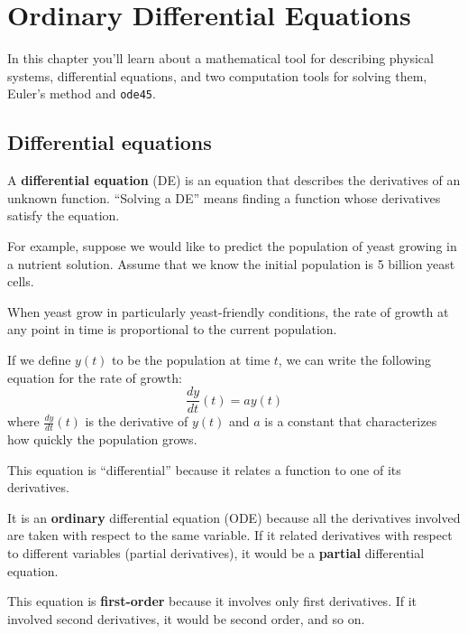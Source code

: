 \documentclass[main.tex]{subfiles}
\begin{document}
\chapter{Ordinary Differential Equations}

In this chapter you'll learn about a mathematical tool for describing physical systems, differential equations, and two computation tools for solving them, Euler's method and {\tt ode45}.


\section{Differential equations}
\label{diffeq}

A {\bf differential equation} (DE) is an equation that describes the
derivatives of an unknown function.  ``Solving a DE'' means finding a
function whose derivatives satisfy the equation.


For example, suppose we would like to predict the population of yeast growing in a nutrient solution.  Assume that we know the initial population is 5 billion yeast cells.

When yeast grow in particularly yeast-friendly
conditions, the rate of growth at any point in time is proportional to
the current population.

If we define $y(t)$ to be the population at 
time $t$, we can write the following equation for the rate of growth:
%
\begin{equation}
\frac{dy}{dt}(t) = a y(t)
\end{equation}
%
where $\frac{dy}{dt}(t)$ is the derivative of $y(t)$ and
$a$ is a constant that characterizes how quickly the population
grows.

This equation is ``differential'' because it relates a function to one of its derivatives.


It is an {\bf ordinary} differential equation (ODE) because all the
derivatives involved are taken with respect to the
same variable.
If it related derivatives with respect to
different variables (partial derivatives), it would be a {\bf partial}
differential equation.


This equation is {\bf first-order} because it involves only first
derivatives.  If it involved second derivatives, it would be second order,
and so on.
\end{document}
